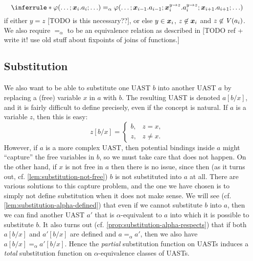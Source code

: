 \documentclass[a4paper, 11pt, article, danish, oneside]{memoir}
\DeclarePairedDelimiter{\auxdelimparen}{(}{)}
\renewcommand{\phi}{\varphi}
\newcommand{\newpar}{\paragraph{}}
\newcommand{\allvar}[2][]{\mathit{V}\auxdelimparen[#1]{#2}}
\begin{document}
\begin{equation*}
    \inferrule*{ }{
        \phi(\ldots ; \seq{x}_i.a_i ; \ldots)
            =_\alpha \phi( \ldots ; \seq{x}_{i-1}.a_{i-1} ; \seq{x}_i^{y \to z}.a_i^{y \to z} ; \seq{x}_{i+1}.a_{i+1} ; \ldots )
    }
\end{equation*}
%
if either $y = z$ [TODO is this necessary??], or else $y \in \bm{x}_i$, $z \not\in \bm{x}_i$ and $z \not\in \allvar{a_i}$. We also require $=_\alpha$ to be an equivalence relation as described in [TODO ref + write it! use old stuff about fixpoints of joins of functions.]


\subsection{Substitution}

\newpar

We also want to be able to substitute one UAST $b$ into another UAST $a$ by replacing a (free) variable $x$ in $a$ with $b$. The resulting UAST is denoted $a[b/x]$, and it is fairly difficult to define precisely, even if the concept is natural. If $a$ is a variable $z$, then this is easy:
%
\begin{equation*}
    z[b/x]
        = \begin{cases}
            b, & z = x, \\
            z, & z \neq x.
        \end{cases}
\end{equation*}
%
However, if $a$ is a more complex UAST, then potential bindings inside $a$ might \enquote{capture} the free variables in $b$, so we must take care that does not happen. On the other hand, if $x$ is not free in $a$ then there is no issue, since then (as it turns out, cf. \cref{lem:substitution-not-free}) $b$ is not substituted into $a$ at all. There are various solutions to this capture problem, and the one we have chosen is to simply not define substitution when it does not make sense. We will see (cf. \cref{lem:substitution-alpha-defined}) that even if we cannot substitute $b$ into $a$, then we can find another UAST $a'$ that is $\alpha$-equivalent to $a$ into which it is possible to substitute $b$. It also turns out (cf. \cref{prop:substitution-alpha-respects}) that if both $a[b/x]$ and $a'[b/x]$ are defined and $a =_\alpha a'$, then we also have $a[b/x] =_\alpha a'[b/x]$. Hence the \emph{partial} substitution function on UASTs induces a \emph{total} substitution function on $\alpha$-equivalence classes of UASTs.
\end{document}

